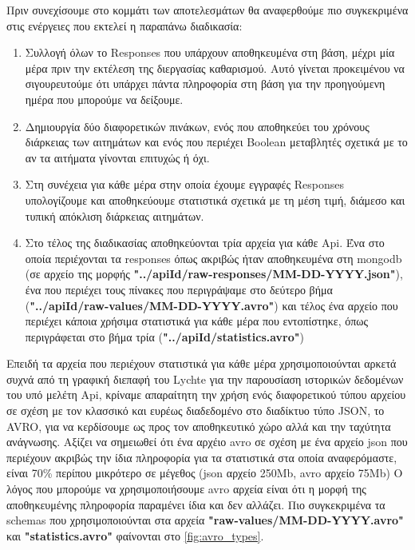 Πριν συνεχίσουμε στο κομμάτι των αποτελεσμάτων θα αναφερθούμε πιο συγκεκριμένα στις
ενέργειες που εκτελεί η παραπάνω διαδικασία:

\begin{enumerate}
	\item Συλλογή όλων το Responses που υπάρχουν αποθηκευμένα στη βάση, μέχρι μία μέρα πριν την εκτέλεση της διεργασίας καθαρισμού. Αυτό γίνεται προκειμένου να σιγουρευτούμε ότι υπάρχει πάντα πληροφορία στη βάση για την προηγούμενη ημέρα που μπορούμε να δείξουμε.
	\item Δημιουργία δύο διαφορετικών πινάκων, ενός που αποθηκεύει του χρόνους διάρκειας των αιτημάτων και ενός που περιέχει Boolean μεταβλητές σχετικά με το αν τα αιτήματα γίνονται επιτυχώς ή όχι.
	\item Στη συνέχεια για κάθε μέρα στην οποία έχουμε εγγραφές Responses υπολογίζουμε και αποθηκεύουμε στατιστικά σχετικά με τη μέση τιμή, διάμεσο και τυπική απόκλιση διάρκειας αιτημάτων.
	\item Στο τέλος της διαδικασίας αποθηκεύονται τρία αρχεία για κάθε Api. Ένα στο οποία περιέχονται τα responses όπως ακριβώς ήταν αποθηκευμένα στη mongodb (σε αρχείο της μορφής \textbf{"../apiId/raw-responses/MM-DD-YYYY.json"}),
		ένα που περιέχει τους πίνακες που περιγράψαμε στο δεύτερο βήμα (\textbf{"../apiId/raw-values/MM-DD-YYYY.avro"}) και τέλος ένα αρχείο που περιέχει κάποια χρήσιμα στατιστικά για κάθε μέρα που εντοπίστηκε, όπως περιγράφεται στο βήμα τρία (\textbf{"../apiId/statistics.avro"}) 
\end{enumerate}

Επειδή τα αρχεία που περιέχουν στατιστικά για κάθε μέρα χρησιμοποιούνται αρκετά συχνά από τη γραφική διεπαφή του Lychte για την παρουσίαση ιστορικών δεδομένων του υπό μελέτη Api, κρίναμε απαραίτητη την χρήση ενός διαφορετικού τύπου αρχείου σε σχέση με
τον κλασσικό και ευρέως διαδεδομένο στο διαδίκτυο τύπο JSON, το AVRO, για να κερδίσουμε ως προς τον αποθηκευτικό χώρο αλλά και την ταχύτητα ανάγνωσης. Αξίζει να σημειωθεί ότι ένα αρχέιο avro σε σχέση με ένα αρχείο json που περιέχουν ακριβώς την ίδια
πληροφορία για τα στατιστικά στα οποία αναφερόμαστε, είναι 70\% περίπου μικρότερο σε μέγεθος (json αρχείο 250Μb, avro αρχείο 75Μb)
Ο λόγος που μπορούμε να χρησιμοποιήσουμε avro αρχεία είναι ότι η μορφή της αποθηκευμένης πληροφορία παραμένει ίδια και δεν αλλάζει. Πιο συγκεκριμένα τα schemas που χρησιμοποιούνται στα αρχεία \textbf{"raw-values/MM-DD-YYYY.avro"} και \textbf{"statistics.avro"}
φαίνονται στο \autoref{fig:avro_types}.

